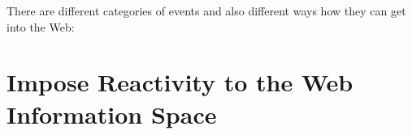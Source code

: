 There are different categories of events and also different ways how they can get into the Web:



\section{Impose Reactivity to the Web Information Space}













